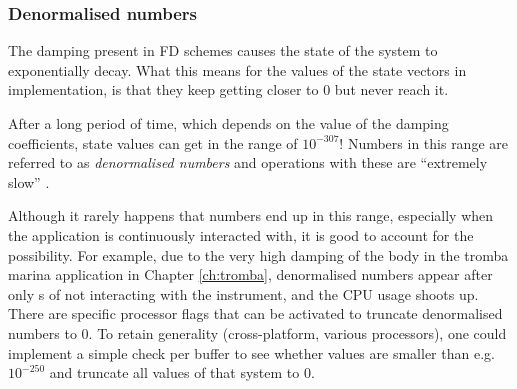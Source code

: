 \subsubsection{Denormalised numbers}
The damping present in FD schemes causes the state of the system to exponentially decay. What this means for the values of the state vectors in implementation, is that they keep getting closer to $0$ but never reach it. 

After a long period of time, which depends on the value of the damping coefficients, state values can get in the range of \textApprox$10^{-307}$! Numbers in this range are referred to as \textit{denormalised numbers} and operations with these are ``extremely slow'' \cite{CPPdenormalised}.

Although it rarely happens that numbers end up in this range, especially when the application is continuously interacted with, it is good to account for the possibility. For example, due to the very high damping of the body in the tromba marina application in Chapter \ref{ch:tromba}, denormalised numbers appear after only  s of not interacting with the instrument, and the CPU usage shoots up. There are specific processor flags that can be activated to truncate denormalised numbers to 0. To retain generality (cross-platform, various processors), one could implement a simple check per buffer to see whether values are smaller than e.g. $10^{-250}$ and truncate all values of that system to $0$. 


